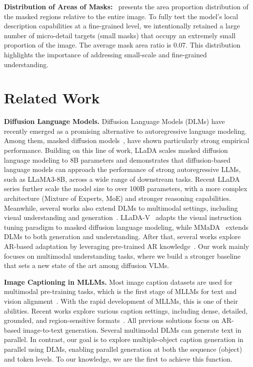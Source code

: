 \documentclass{llmxive}
\begin{document}
\textbf{Distribution of Areas of Masks:}~ presents the area proportion distribution of the masked regions relative to the entire image. 
%
To fully test the model's local description capabilities at a fine-grained level, we intentionally retained a large number of micro-detail targets (small masks) that occupy an extremely small proportion of the image. 
%
The average mask area ratio is 0.07. This distribution highlights the importance of addressing small-scale and fine-grained understanding.


\section{Related Work}
\label{sec:related_work}

\noindent
\textbf{Diffusion Language Models.} Diffusion Language Models (DLMs) have recently emerged as a promising alternative to autoregressive language modeling. 
%
Among them, masked diffusion models~\citep{you2025llada, ye2025dream, yangmmada}, have shown particularly strong empirical performance.
%
Building on this line of work, LLaDA scales masked diffusion language modeling to 8B parameters and demonstrates that diffusion-based language models can approach the performance of strong autoregressive LLMs, such as LLaMA3-8B, across a wide range of downstream tasks.
%
Recent LLaDA series further scale the model size to over 100B parameters, with a more complex architecture (Mixture of Experts, MoE) and stronger reasoning capabilities.
%
Meanwhile, several works also extend DLMs to multimodal settings, including visual understanding and generation~\citep{yangmmada, xin2025lumina}.
%
LLaDA-V~\citep{you2025llada} adapts the visual instruction tuning paradigm to masked diffusion language modeling, while MMaDA~\citep{yangmmada} extends DLMs to both generation and understanding.
%
After that, several works explore AR-based adaptation by leveraging pre-trained AR knowledge~\citep{cheng2025sdar, bie2025llada2}.
%
Our work mainly focuses on multimodal understanding tasks, where we build a stronger baseline that sets a new state of the art among diffusion VLMs.


\noindent
\textbf{Image Captioning in MLLMs.} Most image caption datasets are used for multimodal pre-training tasks, which is the first stage of MLLMs for text and vision alignment~\citep{li2025llava}.
%
With the rapid development of MLLMs, this is one of their abilities.
%
Recent works explore various caption settings, including dense, detailed, grounded, and region-sensitive formats~\citep{li2025denseworld, wang2025grasp}.
%
All previous solutions focus on AR-based image-to-text generation.
%
Several multimodal DLMs can generate text in parallel.
%
In contrast, our goal is to explore multiple-object caption generation in parallel using DLMs, enabling parallel generation at both the sequence (object) and token levels.
%
To our knowledge, we are the first to achieve this function.
\end{document}
